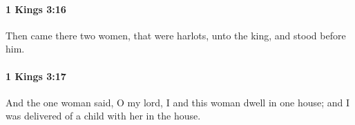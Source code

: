 		\paragraph{1 Kings 3:16} %
			\label{1KINGS-3-16}

			Then came there two women, that were harlots, unto the king, and stood before him.


		\paragraph{1 Kings 3:17} %
			\label{1KINGS-3-17}

			And the one woman said, O my lord, I and this woman dwell in one house; and I was delivered of a child with her in the house.


